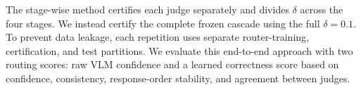 \documentclass[11pt]{article}
\begin{document}
The stage-wise method certifies each judge separately and divides $\delta$
across the four stages. We instead certify the complete frozen cascade using
the full $\delta=0.1$. To prevent data leakage, each repetition uses separate
router-training, certification, and test partitions. We evaluate this
end-to-end approach with two routing scores: raw VLM confidence and a learned
correctness score based on confidence, consistency, response-order stability,
and agreement between judges.




\end{document}
